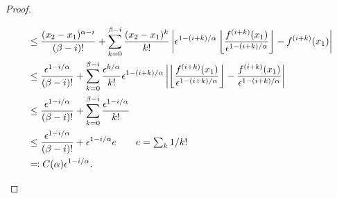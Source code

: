 \begin{proof}
\begin{explanation}
\begin{align*}
			 & \leq \frac{(x_2 - x_1)^{\alpha - i}}{(\beta - i)!} + \sum_{k=0}^{\beta - i} \frac{(x_2 - x_1)^k}{k!} \left\vert \epsilon ^{1 - (i+k) / \alpha } \left\lfloor \frac{f^{(i+k)}(x_1)}{\epsilon ^{1 - (i + k) / \alpha }} \right\rfloor - f^{(i+k)}(x_1) \right\vert                                                         \\
			 & \leq \frac{\epsilon ^{1 - i / \alpha}}{(\beta - i)!} + \sum_{k=0}^{\beta - i} \frac{\epsilon ^{k / \alpha }}{k!} \epsilon ^{1 - (i + k) / \alpha } \left\vert \left\lfloor \frac{f^{(i+k)}(x_1)}{\epsilon ^{1 - (i + k) / \alpha }} \right\rfloor - \frac{f^{(i+k)}(x_1)}{\epsilon ^{1 - (i + k) / \alpha }} \right\vert \\
			 & \leq \frac{\epsilon ^{1 - i / \alpha}}{(\beta - i)!} + \sum_{k=0}^{\beta - i} \frac{\epsilon ^{1 - i / \alpha }}{k!}                                                                                                                                                                                                     \\
			 & \leq \frac{\epsilon ^{1 - i / \alpha}}{(\beta - i)!} + \epsilon ^{1 - i / \alpha } e \tag*{\(e = \sum_{k} 1 / k!\)}                                                                                                                                                                                                      \\
			 & \eqqcolon C(\alpha ) \epsilon ^{1 - i / \alpha }.
		\end{align*}
	\end{explanation}


\end{proof}
